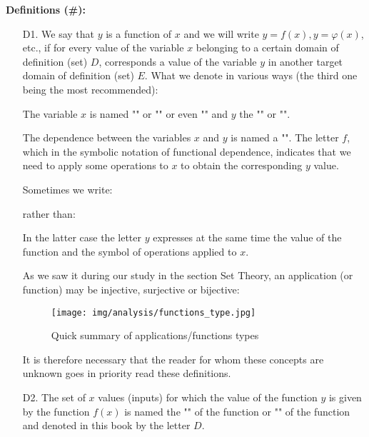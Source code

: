 	\textbf{Definitions (\#\mydef):}
	\begin{enumerate}
		\item[D1.] We say that $y$ is a function of $x$ and we will write $y=f(x),y=\varphi(x)$, etc., if for every value of the variable $x$ belonging to a certain domain of definition (set) $D$, corresponds a value of the variable $y$ in another target domain of definition (set) $E$. What we denote in various ways (the third one being the most recommended):
		
		The variable $x$ is named "" or "" or even "" and $y$ the "" or "".
		
		The dependence between the variables $x$ and $y$ is named a "". The letter $f$, which in the symbolic notation of functional dependence, indicates that we need to apply some operations to $x$ to obtain the corresponding $y$ value.
		
		Sometimes we write:
		
		rather than:
		
		In the latter case the letter $y$ expresses at the same time the value of the function and the symbol of operations applied to $x$.
		\begin{tcolorbox}[title=Remark,colframe=black,arc=10pt]
		As we saw it during our study in the section Set Theory, an application (or function) may be injective, surjective or bijective: 
		\begin{figure}[H]
			\centering
			\texttt{[image: img/analysis/functions\_type.jpg]}
			\caption{Quick summary of applications/functions types}
		\end{figure}
		It is therefore necessary that the reader for whom these concepts are unknown goes in priority read these definitions.
		\end{tcolorbox}
		
		\item[D2.] The set of $x$ values (inputs) for which the value of the function $y$ is given by the function $f (x)$ is named the "" of the function or "\label{domain of definition}" of the function and denoted in this book by the letter $D$.
		

\end{enumerate}
